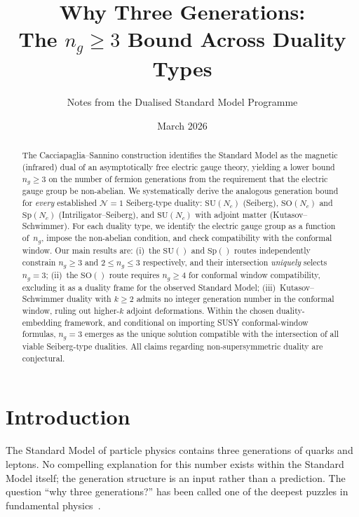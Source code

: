 \documentclass[11pt,a4paper]{article}
\theoremstyle{plain}
\theoremstyle{definition}
\theoremstyle{remark}
\newcommand{\Nc}{N_{\!c}}
\newcommand{\ngen}{n_g}
\newcommand{\SU}[1]{\mathrm{SU}(#1)}
\newcommand{\SO}[1]{\mathrm{SO}(#1)}
\newcommand{\Sp}[1]{\mathrm{Sp}(#1)}
\begin{document}
\title{\textbf{Why Three Generations:\\
The $\ngen \geq 3$ Bound Across Duality Types}}
\author{Notes from the Dualised Standard Model Programme}
\date{March 2026}
\maketitle

\begin{abstract}
The Cacciapaglia--Sannino construction identifies the Standard Model as the
magnetic (infrared) dual of an asymptotically free electric gauge theory,
yielding a lower bound $\ngen \geq 3$ on the number of fermion generations
from the requirement that the electric gauge group be non-abelian.  We
systematically derive the analogous generation bound for \emph{every}
established $\mathcal{N}=1$ Seiberg-type duality: $\SU{\Nc}$ (Seiberg),
$\SO{\Nc}$ and $\Sp{\Nc}$ (Intriligator--Seiberg), and $\SU{\Nc}$ with
adjoint matter (Kutasov--Schwimmer).  For each duality type, we identify
the electric gauge group as a function of~$\ngen$, impose the non-abelian
condition, and check compatibility with the conformal window.  Our main
results are: (i)~the $\SU{}$ and $\Sp{}$ routes independently constrain
$\ngen \geq 3$ and $2 \leq \ngen \leq 3$ respectively, and their intersection
\emph{uniquely} selects $\ngen = 3$; (ii)~the $\SO{}$ route requires
$\ngen \geq 4$ for conformal window compatibility, excluding it as a
duality frame for the observed Standard Model; (iii)~Kutasov--Schwimmer
duality with $k \geq 2$ admits no integer generation number in the
conformal window, ruling out higher-$k$ adjoint deformations.  Within the chosen duality-embedding framework, and conditional on importing SUSY conformal-window formulas, $\ngen = 3$ emerges as the unique
solution compatible with the intersection of all viable Seiberg-type
dualities.  All claims regarding non-supersymmetric duality are
conjectural.
\end{abstract}

\tableofcontents
\newpage

\section{Introduction}
\label{sec:introduction}

The Standard Model of particle physics contains three generations of
quarks and leptons.  No compelling explanation for this number exists
within the Standard Model itself; the generation structure is an input
rather than a prediction.  The question ``why three generations?'' has
been called one of the deepest puzzles in fundamental
physics~\cite{Frampton1992}.
\end{document}
